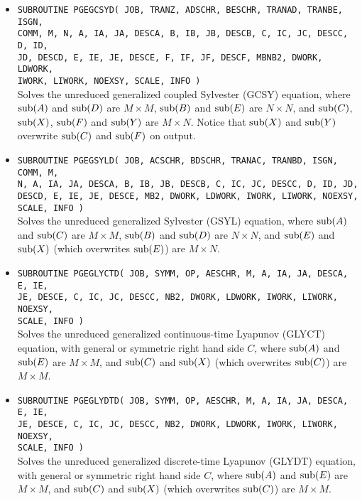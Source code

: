 \documentclass[11pt]{article}
\begin{document}
\begin{itemize}
\item \texttt{SUBROUTINE PGEGCSYD( JOB, TRANZ, ADSCHR, BESCHR,
TRANAD, TRANBE, ISGN, \\ COMM, M, N, A, IA, JA, DESCA, B, IB, JB,
DESCB, C, IC, JC, DESCC, D, ID, \\ JD, DESCD, E, IE, JE, DESCE, F,
IF, JF, DESCF, MBNB2, DWORK, LDWORK, \\ IWORK, LIWORK, NOEXSY, SCALE, INFO )} \\
Solves the unreduced generalized coupled Sylvester (GCSY)
equation, where ${\rm sub}(A)$ and ${\rm sub}(D)$ are $M \times
M$, ${\rm sub}(B)$ and ${\rm sub}(E)$ are $N \times N$, and ${\rm
sub}(C)$, ${\rm sub}(X)$, ${\rm sub}(F)$ and ${\rm sub}(Y)$ are $M
\times N$. Notice that ${\rm sub}(X)$ and ${\rm sub}(Y)$ overwrite
${\rm sub}(C)$ and ${\rm sub}(F)$ on output. \\

\item \texttt{SUBROUTINE PGEGSYLD( JOB, ACSCHR, BDSCHR, TRANAC,
TRANBD, ISGN, COMM, M, \\ N, A, IA, JA, DESCA, B, IB, JB, DESCB,
C, IC, JC, DESCC, D, ID, JD, DESCD, E, IE, JE, DESCE, MB2, DWORK,
LDWORK, IWORK, LIWORK, NOEXSY, SCALE, INFO )}
\\ Solves the unreduced generalized Sylvester (GSYL) equation, where ${\rm sub}(A)$
and ${\rm sub}(C)$ are $M \times M$, ${\rm sub}(B)$ and ${\rm
sub}(D)$ are $N \times N$, and ${\rm sub}(E)$ and ${\rm sub}(X)$
(which overwrites ${\rm sub}(E)$) are $M \times N$. \\

\item \texttt{SUBROUTINE PGEGLYCTD( JOB, SYMM, OP, AESCHR, M, A,
IA, JA, DESCA, E, IE, \\ JE, DESCE, C, IC, JC, DESCC, NB2, DWORK,
LDWORK, IWORK, LIWORK, NOEXSY, \\ SCALE, INFO )} \\ Solves the
unreduced generalized continuous-time Lyapunov (GLYCT) equation,
with general or symmetric right hand side $C$, where ${\rm
sub}(A)$ and ${\rm sub}(E)$ are $M \times M$, and ${\rm sub}(C)$
and ${\rm sub}(X)$ (which overwrites
${\rm sub}(C)$) are $M \times M$. \\

\item \texttt{SUBROUTINE PGEGLYDTD( JOB, SYMM, OP, AESCHR, M, A,
IA, JA, DESCA, E, IE, \\ JE, DESCE, C, IC, JC, DESCC, NB2, DWORK,
LDWORK, IWORK, LIWORK, NOEXSY, \\ SCALE, INFO )} \\ Solves the
unreduced generalized discrete-time Lyapunov (GLYDT) equation,
with general or symmetric right hand side $C$, where ${\rm
sub}(A)$ and ${\rm sub}(E)$ are $M \times M$, and ${\rm sub}(C)$
and ${\rm sub}(X)$
(which overwrites ${\rm sub}(C)$) are $M \times M$. \\
\end{itemize}
\end{document}
